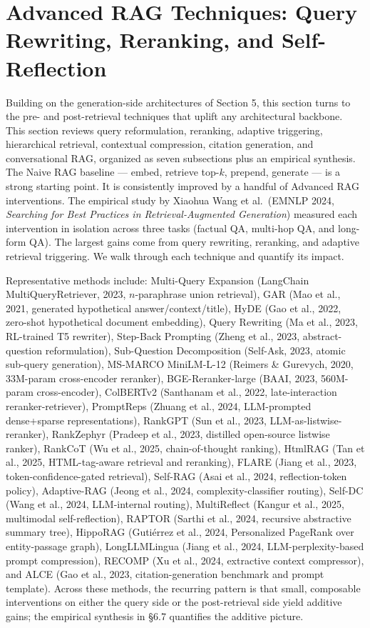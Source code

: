 \documentclass{article}
\begin{document}
\section{Advanced RAG Techniques: Query Rewriting, Reranking, and Self-Reflection}\label{advanced-rag-techniques-query-rewriting-reranking-and-self-reflection}

Building on the generation-side architectures of Section 5, this section turns to the pre- and post-retrieval techniques that uplift any architectural backbone. This section reviews query reformulation, reranking, adaptive triggering, hierarchical retrieval, contextual compression, citation generation, and conversational RAG, organized as seven subsections plus an empirical synthesis. The Naive RAG baseline --- embed, retrieve top-\(k\), prepend, generate --- is a strong starting point. It is consistently improved by a handful of Advanced RAG interventions. The empirical study by Xiaohua Wang et al.~(EMNLP 2024, \emph{Searching for Best Practices in Retrieval-Augmented Generation}) measured each intervention in isolation across three tasks (factual QA, multi-hop QA, and long-form QA). The largest gains come from query rewriting, reranking, and adaptive retrieval triggering. We walk through each technique and quantify its impact.

Representative methods include: Multi-Query Expansion (LangChain MultiQueryRetriever, 2023, \(n\)-paraphrase union retrieval), GAR (Mao et al., 2021, generated hypothetical answer/context/title), HyDE (Gao et al., 2022, zero-shot hypothetical document embedding), Query Rewriting (Ma et al., 2023, RL-trained T5 rewriter), Step-Back Prompting (Zheng et al., 2023, abstract-question reformulation), Sub-Question Decomposition (Self-Ask, 2023, atomic sub-query generation), MS-MARCO MiniLM-L-12 (Reimers \& Gurevych, 2020, 33M-param cross-encoder reranker), BGE-Reranker-large (BAAI, 2023, 560M-param cross-encoder), ColBERTv2 (Santhanam et al., 2022, late-interaction reranker-retriever), PromptReps (Zhuang et al., 2024, LLM-prompted dense+sparse representations), RankGPT (Sun et al., 2023, LLM-as-listwise-reranker), RankZephyr (Pradeep et al., 2023, distilled open-source listwise ranker), RankCoT (Wu et al., 2025, chain-of-thought ranking), HtmlRAG (Tan et al., 2025, HTML-tag-aware retrieval and reranking), FLARE (Jiang et al., 2023, token-confidence-gated retrieval), Self-RAG (Asai et al., 2024, reflection-token policy), Adaptive-RAG (Jeong et al., 2024, complexity-classifier routing), Self-DC (Wang et al., 2024, LLM-internal routing), MultiReflect (Kangur et al., 2025, multimodal self-reflection), RAPTOR (Sarthi et al., 2024, recursive abstractive summary tree), HippoRAG (Gutiérrez et al., 2024, Personalized PageRank over entity-passage graph), LongLLMLingua (Jiang et al., 2024, LLM-perplexity-based prompt compression), RECOMP (Xu et al., 2024, extractive context compressor), and ALCE (Gao et al., 2023, citation-generation benchmark and prompt template). Across these methods, the recurring pattern is that small, composable interventions on either the query side or the post-retrieval side yield additive gains; the empirical synthesis in §6.7 quantifies the additive picture.
\end{document}
